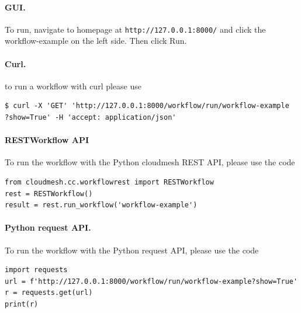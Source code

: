 \paragraph{GUI.} To run, navigate to homepage at
\texttt{http://127.0.0.1:8000/} and click the workflow-example on the
left side. Then click Run.


\paragraph{Curl.} to run a workflow with curl please use

\begin{verbatim}
$ curl -X 'GET' 'http://127.0.0.1:8000/workflow/run/workflow-example
?show=True' -H 'accept: application/json'
\end{verbatim}%

\paragraph{RESTWorkflow API}

To run the workflow with the Python cloudmesh REST API, please use the code

\begin{verbatim} 
from cloudmesh.cc.workflowrest import RESTWorkflow
rest = RESTWorkflow()
result = rest.run_workflow('workflow-example')
\end{verbatim}

\paragraph{Python request API.} To run the workflow with the Python
request API, please use the code

\begin{verbatim}
import requests
url = f'http://127.0.0.1:8000/workflow/run/workflow-example?show=True'
r = requests.get(url)
print(r)
\end{verbatim}






